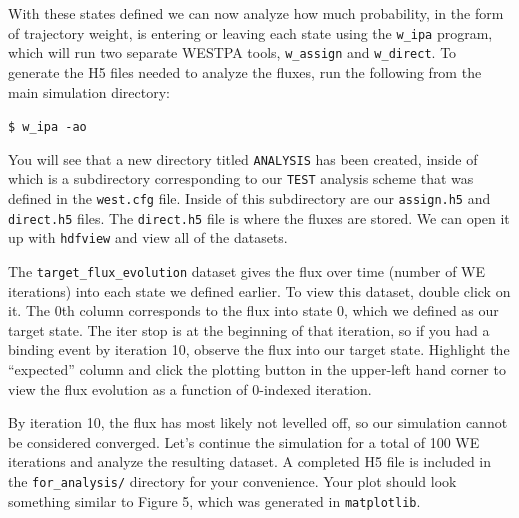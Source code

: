 \documentclass[9pt,tutorial,pubversion]{livecoms}
\begin{document}
With these states defined we can now analyze how much probability, in the form of trajectory weight, is entering or leaving each state using the \verb|w_ipa| program, which will run two separate WESTPA tools, \verb|w_assign| and \verb|w_direct|. 
To generate the H5 files needed to analyze the fluxes, run the following from the main simulation directory:
 
\verb|$ w_ipa -ao|

You will see that a new directory titled \verb|ANALYSIS| has been created, inside of which is a subdirectory corresponding to our \verb|TEST| analysis scheme that was defined in the \verb|west.cfg| file. 
Inside of this subdirectory are our \verb|assign.h5| and \verb|direct.h5| files. 
The \verb|direct.h5| file is where the fluxes are stored. 
We can open it up with \verb|hdfview| and view all of the datasets.
 
The \verb|target_flux_evolution| dataset gives the flux over time (number of WE iterations) into each state we defined earlier. 
To view this dataset, double click on it. 
The 0th column corresponds to the flux into state 0, which we defined as our target state. 
The iter stop is at the beginning of that iteration, so if you had a binding event by iteration 10, observe the  flux into our target state. 
Highlight the “expected” column and click the plotting button in the upper-left hand corner to view the flux evolution as a function of 0-indexed iteration.
 
By iteration 10, the flux has most likely not levelled off, so our simulation cannot be considered converged. 
Let’s continue the simulation for a total of 100 WE iterations and analyze the resulting dataset. 
A completed H5 file is included in the \verb|for_analysis/| directory for your convenience.
Your plot should look something similar to Figure 5, which was generated in \verb|matplotlib|. 
\end{document}

